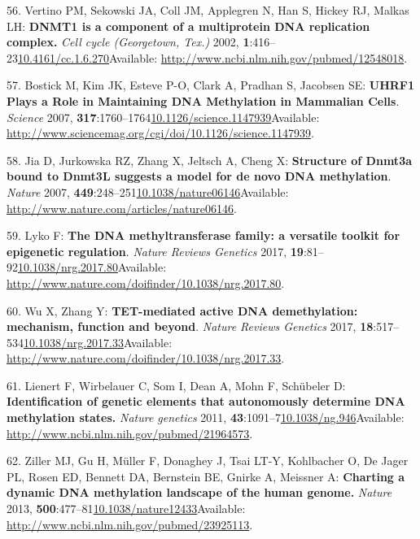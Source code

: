 \documentclass[
]{book}
\begin{document}
\leavevmode\hypertarget{ref-Vertino2002}{}%
56. Vertino PM, Sekowski JA, Coll JM, Applegren N, Han S, Hickey RJ, Malkas LH: \textbf{DNMT1 is a component of a multiprotein DNA replication complex.} \emph{Cell cycle (Georgetown, Tex.)} 2002, \textbf{1}:416--23\href{https://doi.org/10.4161/cc.1.6.270}{10.4161/cc.1.6.270}Available: \url{http://www.ncbi.nlm.nih.gov/pubmed/12548018}.

\leavevmode\hypertarget{ref-Bostick2007}{}%
57. Bostick M, Kim JK, Esteve P-O, Clark A, Pradhan S, Jacobsen SE: \textbf{UHRF1 Plays a Role in Maintaining DNA Methylation in Mammalian Cells}. \emph{Science} 2007, \textbf{317}:1760--1764\href{https://doi.org/10.1126/science.1147939}{10.1126/science.1147939}Available: \url{http://www.sciencemag.org/cgi/doi/10.1126/science.1147939}.

\leavevmode\hypertarget{ref-Jia2009}{}%
58. Jia D, Jurkowska RZ, Zhang X, Jeltsch A, Cheng X: \textbf{Structure of Dnmt3a bound to Dnmt3L suggests a model for de novo DNA methylation}. \emph{Nature} 2007, \textbf{449}:248--251\href{https://doi.org/10.1038/nature06146}{10.1038/nature06146}Available: \url{http://www.nature.com/articles/nature06146}.

\leavevmode\hypertarget{ref-Lyko2017}{}%
59. Lyko F: \textbf{The DNA methyltransferase family: a versatile toolkit for epigenetic regulation}. \emph{Nature Reviews Genetics} 2017, \textbf{19}:81--92\href{https://doi.org/10.1038/nrg.2017.80}{10.1038/nrg.2017.80}Available: \url{http://www.nature.com/doifinder/10.1038/nrg.2017.80}.

\leavevmode\hypertarget{ref-Wu2017}{}%
60. Wu X, Zhang Y: \textbf{TET-mediated active DNA demethylation: mechanism, function and beyond}. \emph{Nature Reviews Genetics} 2017, \textbf{18}:517--534\href{https://doi.org/10.1038/nrg.2017.33}{10.1038/nrg.2017.33}Available: \url{http://www.nature.com/doifinder/10.1038/nrg.2017.33}.

\leavevmode\hypertarget{ref-Lienert2011}{}%
61. Lienert F, Wirbelauer C, Som I, Dean A, Mohn F, Schübeler D: \textbf{Identification of genetic elements that autonomously determine DNA methylation states.} \emph{Nature genetics} 2011, \textbf{43}:1091--7\href{https://doi.org/10.1038/ng.946}{10.1038/ng.946}Available: \url{http://www.ncbi.nlm.nih.gov/pubmed/21964573}.

\leavevmode\hypertarget{ref-Ziller2013}{}%
62. Ziller MJ, Gu H, Müller F, Donaghey J, Tsai LT-Y, Kohlbacher O, De Jager PL, Rosen ED, Bennett DA, Bernstein BE, Gnirke A, Meissner A: \textbf{Charting a dynamic DNA methylation landscape of the human genome.} \emph{Nature} 2013, \textbf{500}:477--81\href{https://doi.org/10.1038/nature12433}{10.1038/nature12433}Available: \url{http://www.ncbi.nlm.nih.gov/pubmed/23925113}.
\end{document}

